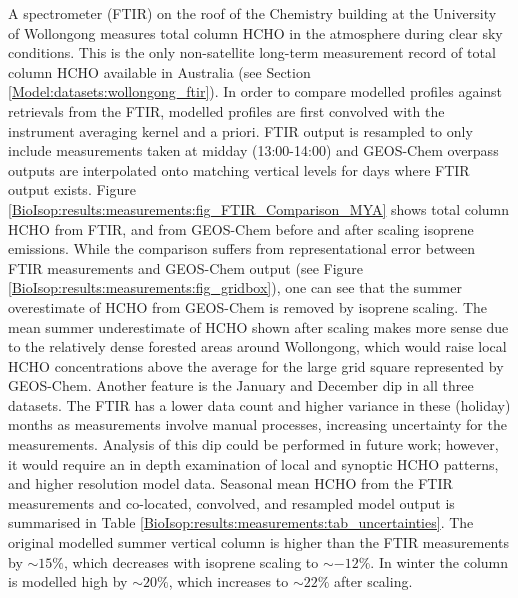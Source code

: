 \documentclass[acp, manuscript]{copernicus}
\begin{document}
    A spectrometer (FTIR) on the roof of the Chemistry building at the University of Wollongong measures total column HCHO in the atmosphere during clear sky conditions.
    This is the only non-satellite long-term measurement record of total column HCHO available in Australia (see Section \ref{Model:datasets:wollongong_ftir}).
    In order to compare modelled profiles against retrievals from the FTIR, modelled profiles are first convolved with the instrument averaging kernel and a priori. %
    FTIR output is resampled to only include measurements taken at midday (13:00-14:00) and GEOS-Chem overpass outputs are interpolated onto matching vertical levels for days where FTIR output exists.
    Figure \ref{BioIsop:results:measurements:fig_FTIR_Comparison_MYA} shows total column HCHO from FTIR, and from GEOS-Chem before and after scaling isoprene emissions.
    While the comparison suffers from representational error between FTIR measurements and GEOS-Chem output (see Figure \ref{BioIsop:results:measurements:fig_gridbox}), one can see that the summer overestimate of HCHO from GEOS-Chem is removed by isoprene scaling.
    The mean summer underestimate of HCHO shown after scaling makes more sense due to the relatively dense forested areas around Wollongong, which would raise local HCHO concentrations above the average for the large grid square represented by GEOS-Chem.
    Another feature is the January and December dip in all three datasets.
    The FTIR has a lower data count and higher variance in these (holiday) months as measurements involve manual processes, increasing uncertainty for the measurements.
    Analysis of this dip could be performed in future work; however, it would require an in depth examination of local and synoptic HCHO patterns, and higher resolution model data.
    Seasonal mean HCHO from the FTIR measurements and co-located, convolved, and resampled model output is summarised in Table \ref{BioIsop:results:measurements:tab_uncertainties}.
    The original modelled summer vertical column is higher than the FTIR measurements by $\sim{15}\%$, which decreases with isoprene scaling to $\sim{-12}\%$.
    In winter the column is modelled high by $\sim{20}\%$, which increases to $\sim{22}\%$ after scaling.
    
\end{document}
